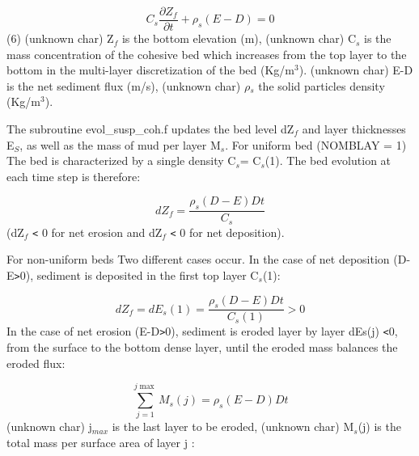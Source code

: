 \begin{equation*}
C_{s} \frac{\partial Z_{f} }{\partial t} +\rho _{s} (E-D)=0 
\end{equation*}%
\hspace{5mm} (6) \newline
(unknown char)\hspace{5mm} Z$_{f}$ is the bottom elevation (m), \newline
(unknown char)\hspace{5mm} C$_{s}$ is the mass concentration of the cohesive
bed which increases from the top layer to the bottom in the multi-layer
discretization of the bed (Kg/m$^{3}$). \newline
(unknown char)\hspace{5mm} E-D is the net sediment flux (m/s), \newline
(unknown char)\hspace{5mm} $\rho$$_{s}$ the solid particles density (Kg/m$%
^{3}$).

The subroutine evol\_susp\_coh.f updates the bed level dZ$_{f}$ and layer
thicknesses E$_{S}$, as well as the mass of mud per layer M$_{s}$.\newline
For uniform bed (NOMBLAY = 1)\newline
The bed is characterized by a single density C$_{s}$= C$_{s}$(1). The bed
evolution at each time step is therefore:

\begin{equation*}
dZ_{f} =\frac{\rho _{s}^{} (D-E)Dt}{C_{s} } 
\end{equation*}
(dZ$_{f}$ \texttt{<} 0 for net erosion and dZ$_{f}$ \texttt{<} 0 for net
deposition).

For non-uniform beds\newline
Two different cases occur. In the case of net deposition (D-E\texttt{>}0),
sediment is deposited in the first top layer C$_{s}$(1):

\begin{equation*}
dZ_{f} =dE_{s} (1)=\frac{\rho _{s}^{} (D-E)Dt}{C_{s} (1)} >0 
\end{equation*}
In the case of net erosion (E-D\texttt{>}0), sediment is eroded layer by
layer dEs(j) \texttt{<}0, from the surface to the bottom dense layer, until
the eroded mass balances the eroded flux:

\begin{equation*}
\sum\limits_{j=1}^{j\max } M_{s} (j)=\rho _{s} (E-D)Dt 
\end{equation*}%
(unknown char)\hspace{5mm} j$_{max}$ is the last layer to be eroded,\newline
(unknown char)\hspace{5mm} M$_{s}$(j) is the total mass per surface area of
layer j :\hspace{5mm}

